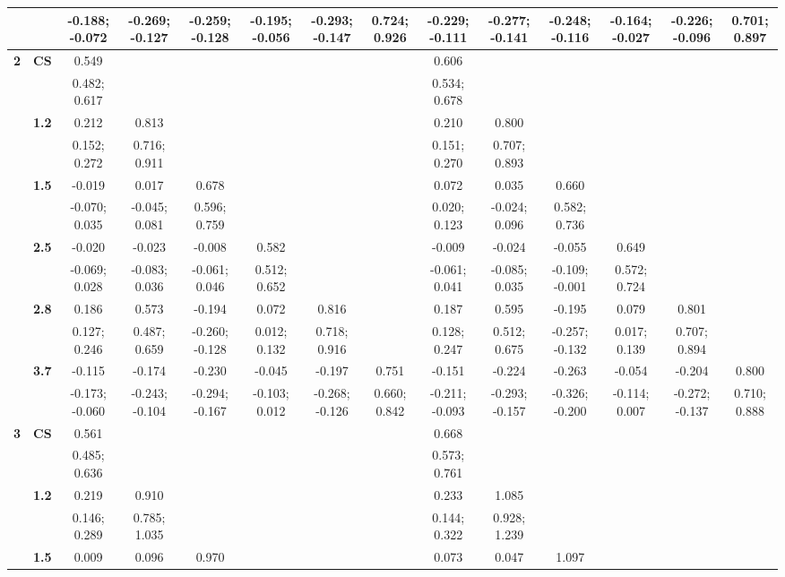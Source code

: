 \begin{landscape}
\begin{table}[!htp]
\begin{center}
\begin{tabular}{>{\bfseries}c>{\bfseries}ccccccccccccc}
 &  & -0.188; -0.072 & -0.269; -0.127 & -0.259; -0.128 & -0.195; -0.056 & -0.293; -0.147 & 0.724; 0.926 & -0.229; -0.111 & -0.277; -0.141 & -0.248; -0.116 & -0.164; -0.027 & -0.226; -0.096 & 0.701; 0.897\\[0.7ex]
 \midrule
2 & CS & 0.549 &  &  &  &  &  & 0.606 &  &  &  &  & \\
 &  & 0.482; 0.617 &  &  &  &  &  & 0.534; 0.678 &  &  &  &  & \\[0.7ex]
 & 1.2 & 0.212 & 0.813 &  &  &  &  & 0.210 & 0.800 &  &  &  & \\
 &  & 0.152; 0.272 & 0.716; 0.911 &  &  &  &  & 0.151; 0.270 & 0.707; 0.893 &  &  &  & \\[0.7ex]
 & 1.5 & -0.019 & 0.017 & 0.678 &  &  &  & 0.072 & 0.035 & 0.660 &  &  & \\
 &  & -0.070; 0.035 & -0.045; 0.081 & 0.596; 0.759 &  &  &  & 0.020; 0.123 & -0.024; 0.096 & 0.582; 0.736 &  &  & \\[0.7ex]
 & 2.5 & -0.020 & -0.023 & -0.008 & 0.582 &  &  & -0.009 & -0.024 & -0.055 & 0.649 &  & \\
 &  & -0.069; 0.028 & -0.083; 0.036 & -0.061; 0.046 & 0.512; 0.652 &  &  & -0.061; 0.041 & -0.085; 0.035 & -0.109; -0.001 & 0.572; 0.724 &  & \\[0.7ex]
 & 2.8 & 0.186 & 0.573 & -0.194 & 0.072 & 0.816 &  & 0.187 & 0.595 & -0.195 & 0.079 & 0.801 & \\
 &  & 0.127; 0.246 & 0.487; 0.659 & -0.260; -0.128 & 0.012; 0.132 & 0.718; 0.916 &  & 0.128; 0.247 & 0.512; 0.675 & -0.257; -0.132 & 0.017; 0.139 & 0.707; 0.894 & \\[0.7ex]
 & 3.7 & -0.115 & -0.174 & -0.230 & -0.045 & -0.197 & 0.751 & -0.151 & -0.224 & -0.263 & -0.054 & -0.204 & 0.800\\
 &  & -0.173; -0.060 & -0.243; -0.104 & -0.294; -0.167 & -0.103; 0.012 & -0.268; -0.126 & 0.660; 0.842 & -0.211; -0.093 & -0.293; -0.157 & -0.326; -0.200 & -0.114; 0.007 & -0.272; -0.137 & 0.710; 0.888\\[0.7ex]
 \midrule
3 & CS & 0.561 &  &  &  &  &  & 0.668 &  &  &  &  & \\
 &  & 0.485; 0.636 &  &  &  &  &  & 0.573; 0.761 &  &  &  &  & \\[0.7ex]
 & 1.2 & 0.219 & 0.910 &  &  &  &  & 0.233 & 1.085 &  &  &  & \\
 &  & 0.146; 0.289 & 0.785; 1.035 &  &  &  &  & 0.144; 0.322 & 0.928; 1.239 &  &  &  & \\[0.7ex]
 & 1.5 & 0.009 & 0.096 & 0.970 &  &  &  & 0.073 & 0.047 & 1.097 &  &  & \\

\end{tabular}
\end{center}
\end{table}
\end{landscape}
